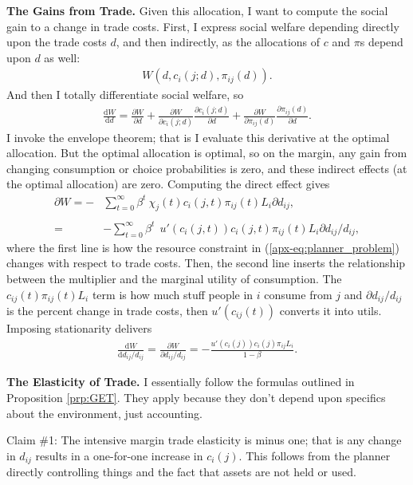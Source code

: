 \documentclass[12pt,pdftex]{article}
\begin{document}
\begin{onehalfspacing}
\textbf{The Gains from Trade.} Given this allocation, I want to compute the social gain to a change in trade costs. First, I express social welfare depending directly upon the trade costs $d$, and then indirectly, as the allocations of $c$ and $\pi$s depend upon $d$ as well:
\begin{align}
W(d, c_{i}(j; d), \pi_{ij}(d)).
\end{align}
And then I totally differentiate social welfare, so
\begin{align}
\frac{\mathrm{d} W}{\mathrm{d}d} = \frac{\partial W}{\partial d} + \frac{\partial W}{\partial c_{i}(j;d)}\frac{\partial c_{i}(j;d)}{\partial d} + \frac{\partial W}{\partial \pi_{ij}(d)}\frac{\partial \pi_{ij}(d)}{\partial d}.
\end{align}
I invoke the envelope theorem; that is I evaluate this derivative at the optimal allocation. But the optimal allocation is optimal, so on the margin, any gain from changing consumption or choice probabilities is zero, and these indirect effects (at the optimal allocation) are zero. Computing the direct effect gives
\begin{align}
\partial W = - & \sum_{t=0}^{\infty} \beta^{t} \ \chi_{j}(t) c_{i}(j,t) \pi_{ij}(t) L_{i} \partial d_{ij}, \\
\nonumber \\
=& - \sum_{t=0}^{\infty} \beta^{t} \  \ u'(c_{i}(j,t)) c_{i}(j,t) \pi_{ij}(t) L_{i} \partial d_{ij} / d_{ij},
\end{align}
where the first line is how the resource constraint in (\ref{apx-eq:planner_problem}) changes with respect to trade costs. Then, the second line inserts the relationship between the multiplier and the marginal utility of consumption. The $c_{ij}(t) \pi_{ij}(t) L_{i}$ term is how much stuff people in $i$ consume from $j$ and $\partial d_{ij} / d_{ij}$ is the percent change in trade costs, then $u'(c_{ij}(t))$ converts it into utils. Imposing stationarity delivers
\begin{align}
\frac{\mathrm{d} W}{\mathrm{d}d_{ij} / d_{ij}} = \frac{\partial W}{\partial d_{ij} / d_{ij}} = -\frac{ u'(c_{i}(j)) c_{i}(j) \pi_{ij} L_{i}}{1- \beta}. \label{apx-eq:gains1}
\end{align}

\textbf{The Elasticity of Trade.} I essentially follow the formulas outlined in Proposition \ref{prp:GET}. They apply because they don't depend upon specifics about the environment, just accounting.

Claim \#1: The intensive margin trade elasticity is minus one; that is any change in $d_{ij}$ results in a one-for-one increase in $c_{i}(j)$. This follows from the planner directly controlling things and the fact that assets are not held or used.


\end{onehalfspacing}
\end{document}
